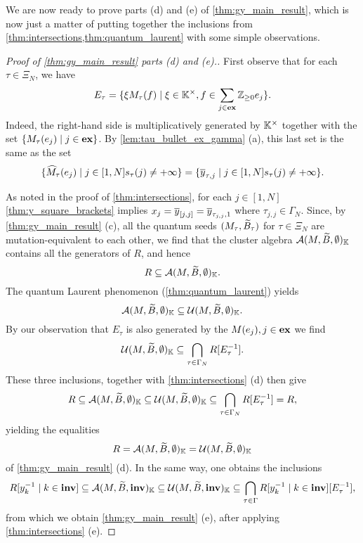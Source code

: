 We are now ready to prove parts (d) and (e) of \cref{thm:gy_main_result}, which is now
just a matter of putting together the inclusions from
\cref{thm:intersections,thm:quantum_laurent} with some simple observations.
\begin{proof}[Proof of \cref{thm:gy_main_result} parts (d) and (e).]
	First observe that for each $\tau\in \Xi_N$, we have
	\begin{equation*}
		E_\tau = \{\xi M_\tau(f) \mid \xi \in \mathbb{K}^\times, f \in \sum_{j \in \mathbf{ex}} \mathbb{Z}_{\geq 0} e_j\}.
	\end{equation*}
	Indeed, the right-hand side is multiplicatively generated by $\mathbb{K}^\times$ together
	with the set $\{ M_\tau(e_j) \mid j \in \mathbf{ex}\}$. By \cref{lem:tau_bullet_ex_gamma} (a),
	this last set is the same as the set
	\begin{equation*}
		\{ \widehat{M}_\tau(e_j) \mid j \in [1, N] s_\tau(j) \neq + \infty\} = \{ \overline{y}_{\tau, j} \mid j \in [1, N] s_\tau(j) \neq + \infty\}.
	\end{equation*}

	As noted in the proof of \cref{thm:intersections}, for each $j \in [1, N]$
	\cref{thm:y_square_brackets} implies $x_j = \overline{y}_{[j, j]} = \overline{y}_{\tau_{j,j}, 1}$ where
	$\tau_{j,j} \in \Gamma_N$. Since, by \cref{thm:gy_main_result} (c), all the quantum
	seeds $(M_\tau, \widetilde{B}_\tau)$ for $\tau \in \Xi_N$ are mutation-equivalent to each other,
	we find that the cluster algebra $\mathcal{A}(M, \widetilde{B}, \emptyset)_{\mathbb{K}}$ contains all the
	generators of $R$, and hence
	\begin{equation*}
		R \subseteq \mathcal{A}(M, \widetilde{B}, \emptyset)_{\mathbb{K}}.
	\end{equation*}
	The quantum Laurent phenomenon (\cref{thm:quantum_laurent}) yields
	\begin{equation*}
		\mathcal{A}(M, \widetilde{B}, \emptyset)_{\mathbb{K}} \subseteq \mathcal{U} (M, \widetilde{B}, \emptyset)_{\mathbb{K}}.
	\end{equation*}
	By our observation that $E_\tau$ is also generated by the $M(e_j), j\in \mathbf{ex}$ we find
	\begin{equation*}
		\mathcal{U}(M, \widetilde{B}, \emptyset)_{\mathbb{K}} \subseteq \bigcap_{\tau \in \Gamma_N} R[E^{-1}_\tau].
	\end{equation*}
	These three inclusions, together with \cref{thm:intersections} (d) then give
	\begin{equation*}
		R \subseteq \mathcal{A}(M, \widetilde{B}, \emptyset)_{\mathbb{K}} \subseteq \mathcal{U} (M, \widetilde{B}, \emptyset)_{\mathbb{K}}\subseteq \bigcap_{\tau \in \Gamma_N} R[E^{-1}_\tau] = R,
	\end{equation*}
	yielding the equalities
	\begin{equation*}
		R = \mathcal{A}(M, \widetilde{B}, \emptyset)_{\mathbb{K}} = \mathcal{U} (M, \widetilde{B}, \emptyset)_{\mathbb{K}}
	\end{equation*}
	of \cref{thm:gy_main_result} (d). In the same way, one obtains the inclusions
	\begin{equation*}
		R[y_k^{-1} \mid k \in \mathbf{inv}] \subseteq \mathcal{A}(M, \widetilde{B}, \mathbf{inv})_{\mathbb{K}} \subseteq \mathcal{U}(M, \widetilde{B}, \mathbf{inv})_{\mathbb{K}} \subseteq \bigcap_{\tau \in \Gamma} R[y_k^{-1} \mid k \in \mathbf{inv}][E^{-1}_\tau] ,
	\end{equation*}
	from which we obtain \cref{thm:gy_main_result} (e), after applying
	\cref{thm:intersections} (e).
\end{proof}
